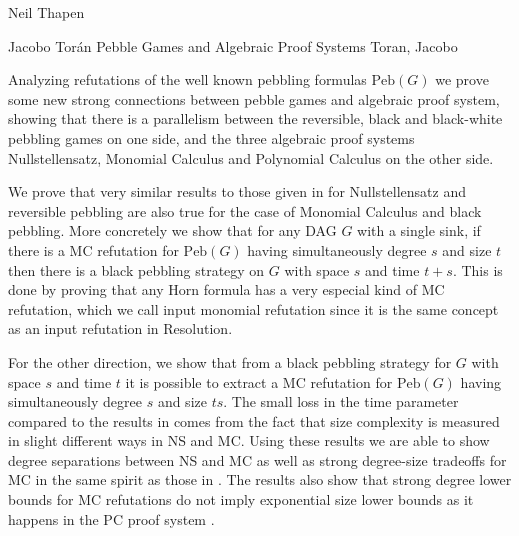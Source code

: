 \documentclass[report]{owrart}
\newcommand{\peb}{\mathrm {Peb}}
\begin{document}
\begin{report}
\begin{talk}{Neil Thapen}
\begin{thebibliography}{99}
       
           
           \end{thebibliography}
           
   \end{talk}
   


\begin{talk}{Jacobo Tor\'{a}n}
  {Pebble Games and Algebraic Proof Systems}
  {Toran, Jacobo}
  
  \noindent
  Analyzing refutations of  the well known
    pebbling formulas $\peb(G)$    we prove some new strong connections between pebble games and algebraic proof system,  showing that
    there is a parallelism between the reversible, black and black-white pebbling games on one side, and
    the three algebraic proof systems Nullstellensatz, Monomial Calculus \cite{BerkholzG15} 
    and Polynomial Calculus  on the other side.  

We prove that very similar  results to those given in \cite{RezendeMNR21} for Nullstellensatz and reversible pebbling
are also true for the case of Monomial Calculus and black pebbling. More concretely we show
that for any DAG $G$ with a single sink, if there is a MC refutation 
for  $\peb(G)$ having simultaneously degree $s$ and size $t$ 
then there is a black pebbling strategy on $G$ with space $s$ and time $t+s$.
This is done by proving that any Horn formula has a very especial kind of MC
refutation, which we call input monomial refutation since it is the same concept
as an input refutation in Resolution. 

For the other direction, we  show  that from a black pebbling strategy for $G$ with space $s$ and time $t$ it is possible to extract
a MC refutation 
for  $\peb(G)$ having simultaneously degree $s$ and size $ts$. 
The small loss in the time parameter compared to the results in \cite{RezendeMNR21} comes from the fact that size complexity is measured in slight 
different ways in NS and MC.
Using these results we are able to show degree separations between NS and MC
as well as strong  degree-size tradeoffs for MC in the same spirit as those in \cite{RezendeMNR21}. The results also show that strong degree
lower bounds for MC refutations do not imply exponential size 
lower bounds as it happens in the PC proof system \cite{IPS99LowerBounds}.



\end{talk}
\end{report}
\end{document}
